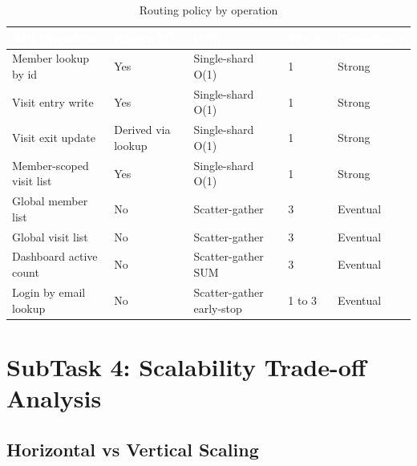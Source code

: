 \documentclass[a4paper,12pt]{article}
\newcommand{\tablehead}[1]{\textcolor{white}{\textbf{#1}}}
\begin{document}
\begin{table}[H]
\centering
\caption{Routing policy by operation}
\begin{tcolorbox}[tableframe,width=\textwidth,box align=center]
\scriptsize
{}
\begin{tabularx}{\linewidth}{>{\raggedright\arraybackslash}X C{2.1cm} >{\raggedright\arraybackslash}X C{1.25cm} C{1.6cm}}
\toprule
{}
\tablehead{API Operation} & \tablehead{Known id?} & \tablehead{Path} & \tablehead{Shards} & \tablehead{Consistency} \\
\midrule
Member lookup by id & Yes & Single-shard O(1) & 1 & Strong \\
Visit entry write & Yes & Single-shard O(1) & 1 & Strong \\
Visit exit update & Derived via lookup & Single-shard O(1) & 1 & Strong \\
Member-scoped visit list & Yes & Single-shard O(1) & 1 & Strong \\
Global member list & No & Scatter-gather & 3 & Eventual \\
Global visit list & No & Scatter-gather & 3 & Eventual \\
Dashboard active count & No & Scatter-gather SUM & 3 & Eventual \\
Login by email lookup & No & Scatter-gather early-stop & 1 to 3 & Eventual \\
\bottomrule
\end{tabularx}
\end{tcolorbox}
\end{table}

\newpage
\section{SubTask 4: Scalability Trade-off Analysis}
\label{sec:subtask4}

\subsection{Horizontal vs Vertical Scaling}
\end{document}
